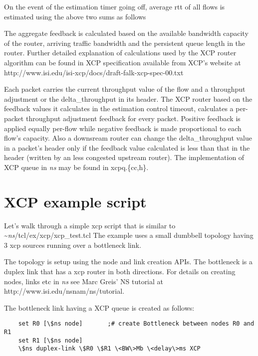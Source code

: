     On the event of the estimation timer going off, average rtt of all
    flows is estimated using the above two sums as follows

    
    The aggregate feedback is calculated based on the available bandwidth
    capacity of the router, arriving traffic bandwidth and the persistent
    queue length in the router. Further detailed explanation of
    calculations used by the XCP router algorithm can be found in XCP
    specification available from XCP's website at
    http://www.isi.edu/isi-xcp/docs/draft-falk-xcp-spec-00.txt 
    
    Each packet carries the current throughput value of the flow and a
    throughput adjustment or the delta\_throughput in its header. The XCP
    router based on the feedback values it calculates in the estimation
    control timeout, calculates a per-packet throughput adjustment
    feedback for every packet. Positive feedback is applied equally
    per-flow while negative feedback is made proportional to each flow's
    capacity. Also a downsream router can change the delta\_throughput
    value in a packet's header only if the feedback value calculated is
    less than that in the header (written by an less congested upstream
    router). The implementation of XCP queue in \emph{ns}{} may be found in
    xcpq.\{cc,h\}. 
    
  
    \section{XCP example script}
    \label{sec:example}
    
    Let's walk through a simple xcp script that is similar to
    \textasciitilde\emph{ns}/{tcl/ex/xcp/xcp\_test.tcl} 
    The example uses a small dumbbell topology having 3 xcp sources
    running over a bottleneck link.
    
    The topology is setup using the node and link creation APIs. The bottleneck
    is a duplex link that has a xcp router in both directions. For
    details on creating nodes, links etc in \emph{ns}{} see Marc Greis' NS
    tutorial at http://www.isi.edu/nsnam/ns/tutorial.
  
    The bottleneck link having a XCP queue is created as follows:
  \begin{verbatim}
    set R0 [\$ns node]       ;# create Bottleneck between nodes R0 and R1 
    set R1 [\$ns node]
    \$ns duplex-link \$R0 \$R1 \<BW\>Mb \<delay\>ms XCP 
  \end{verbatim} %


